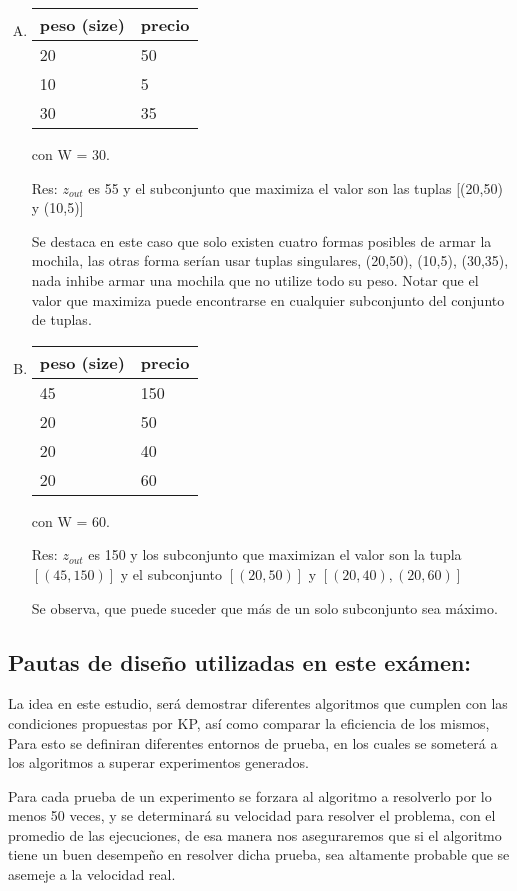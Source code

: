 \documentclass[fleqn, 11pt]{article}
\begin{document}
\begin{enumerate}[A.]

\item
\begin{tabular}{l l}
	peso (size) & precio \\ \toprule
    20 & 50 \\
    10 & 5  \\
    30 & 35  \\
\end{tabular}
con W = 30.

Res: $z_{out}$ es 55 y el subconjunto que maximiza el valor son las tuplas
[(20,50) y (10,5)]

Se destaca en este caso que solo existen cuatro formas posibles de armar la
mochila, las otras forma serían usar tuplas singulares, (20,50), (10,5),
(30,35), nada inhibe armar una mochila que no utilize todo su peso. Notar que
el valor que maximiza puede encontrarse en cualquier subconjunto del conjunto
de tuplas.

\item
\begin{tabular}{l l}
	peso (size) & precio \\
	\toprule
	45 & 150 \\
	20 & 50 \\
	20  & 40 \\
	20 & 60
\end{tabular}
con W = 60.

Res: $z_{out}$ es 150 y los subconjunto que maximizan el valor son la tupla
$[(45,150)]$ y el subconjunto $[(20, 50)]$ y $[(20, 40), (20, 60)]$

Se observa, que puede suceder que más de un solo subconjunto sea máximo.

\end{enumerate}

\subsection{Pautas de diseño utilizadas en este exámen:}

La idea en este estudio, será demostrar diferentes algoritmos que cumplen con
las condiciones propuestas por KP, así como comparar la eficiencia de los
mismos, Para esto se definiran diferentes entornos de prueba, en los cuales se
someterá a los algoritmos a superar experimentos generados.

Para cada prueba de un experimento se forzara al algoritmo a resolverlo por lo
menos 50 veces, y se determinará su velocidad para resolver el problema, con el
promedio de las ejecuciones, de esa manera nos aseguraremos que si el algoritmo
tiene un buen desempeño en resolver dicha prueba, sea altamente probable que se
asemeje a la velocidad real.
\end{document}

